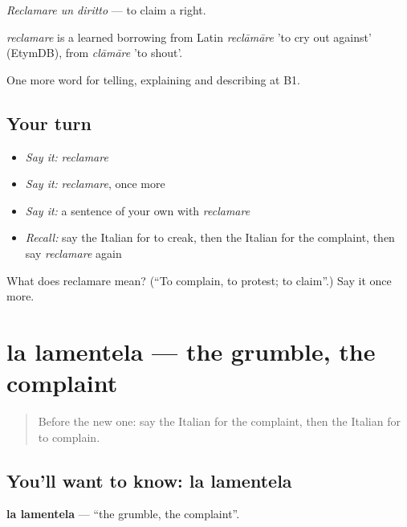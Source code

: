 \emph{Reclamare un diritto} — to claim a right.

\begin{cousinweb}
\emph{reclamare} is a learned borrowing from Latin \emph{reclāmāre} 'to cry out against' (EtymDB), from \emph{clāmāre} 'to shout'.
\end{cousinweb}

\begin{grammarlens}[title={What you've built}]
One more word for telling, explaining and describing at B1.
\end{grammarlens}

\subsection*{Your turn}
\begin{itemize}
\raggedright
  \item \emph{Say it:} \emph{reclamare}
  \item \emph{Say it:} \emph{reclamare}, once more
  \item \emph{Say it:} a sentence of your own with \emph{reclamare}
  \item \emph{Recall:} say the Italian for to creak, then the Italian for the complaint, then say \emph{reclamare} again
\end{itemize}

\begin{tcolorbox}[breakable,colback=teal!4,colframe=teal!35!black,title={Before you move on}]
What does reclamare mean? (\textquotedblleft{}To complain, to protest; to claim\textquotedblright{}.) Say it once more.
\end{tcolorbox}
\section[la lamentela]{la lamentela — the grumble, the complaint}

\label{lesson:IT-C438-lamentela}



\begin{quote}
Before the new one: say the Italian for the complaint, then the Italian for to complain.
\end{quote}

\subsection*{You'll want to know: la lamentela}
\textbf{la lamentela} — \textquotedblleft{}the grumble, the complaint\textquotedblright{}.

